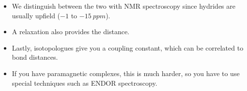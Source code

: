 \documentclass[../notes.tex]{subfiles}
\begin{document}
\begin{itemize}
\begin{itemize}
        \item We distinguish between the two with NMR spectroscopy since  hydrides are usually upfield ($-1$ to $\SI{-15}{ppm}$).
        \item A  relaxation also provides the  distance.
        \item Lastly,  isotopologues give you a  coupling constant, which can be correlated to bond distances.
        \item If you have paramagnetic complexes, this is much harder, so you have to use special techniques such as ENDOR  spectroscopy.
    \end{itemize}
\end{itemize}
\end{document}
